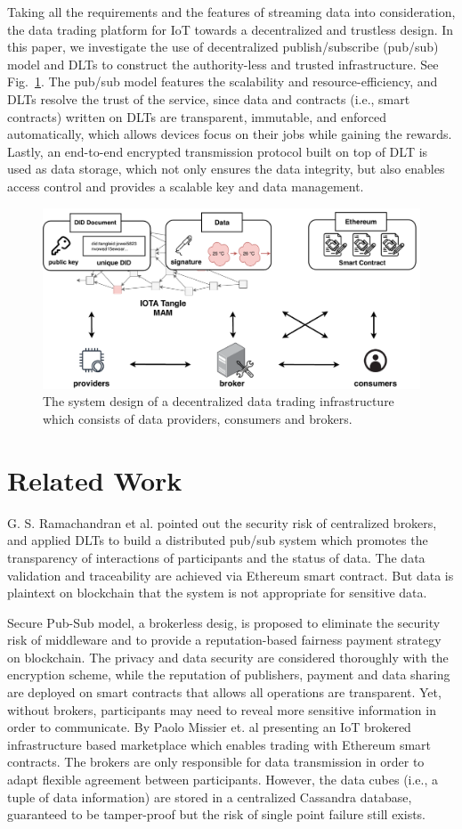\documentclass[conference]{IEEEtran}
\begin{document}
Taking all the requirements and the features of streaming data into consideration, the data trading platform for IoT towards a decentralized and trustless design. In this paper, we investigate the use of decentralized publish/subscribe (pub/sub) model and DLTs to construct the authority-less and trusted infrastructure. See Fig.~\ref{fig:system_design}. The pub/sub model features the scalability and resource-efficiency, and DLTs resolve the trust of the service, since data and contracts (i.e., smart contracts) written on DLTs are transparent, immutable, and enforced automatically, which allows devices focus on their jobs while gaining the rewards. Lastly, an end-to-end encrypted transmission protocol built on top of DLT is used as data storage, which not only ensures the data integrity, but also enables access control and provides a scalable key and data management.

\begin{figure}[!t]
    \centering
    \includegraphics[width=3.in]{system_design}
    \caption{The system design of a decentralized data trading infrastructure which consists of data providers, consumers and brokers.}
    \label{fig:system_design}
\end{figure}

\section{Related Work}
\label{section:relatedWork}
G. S. Ramachandran et al.\cite{trinity} pointed out the security risk of centralized brokers, and applied DLTs to build a distributed pub/sub system which promotes the transparency of interactions of participants and the status of data. The data validation and traceability are achieved via Ethereum smart contract. But data is plaintext on blockchain that the system is not appropriate for sensitive data.

Secure Pub-Sub model\cite{SPS}, a brokerless desig, is proposed to eliminate the security risk of middleware and to provide a reputation-based fairness payment strategy on blockchain.
The privacy and data security are considered thoroughly with the encryption scheme, while the reputation of publishers, payment and data sharing are deployed on smart contracts that allows all operations are transparent. Yet, without brokers, participants may need to reveal more sensitive information in order to communicate. By Paolo Missier et. al\cite{MindMyValue} presenting an IoT brokered infrastructure based marketplace which enables trading with Ethereum smart contracts. The brokers are only responsible for data transmission in order to adapt flexible agreement between participants. However, the data cubes (i.e., a tuple of data information) are stored in a centralized Cassandra database, guaranteed to be tamper-proof but the risk of single point failure still exists.
\end{document}
